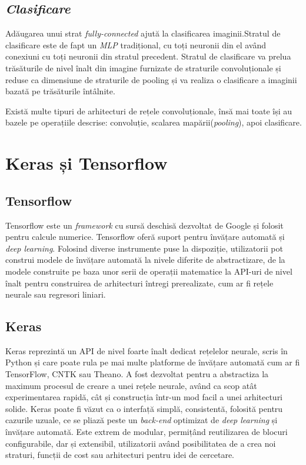 \subsection{\textit{Clasificare}}
 Adăugarea unui strat \textit{fully-connected} ajută la clasificarea imaginii.Stratul de clasificare este de fapt un \textit{MLP} tradițional, cu toți neuronii din el având conexiuni cu toți neuronii din stratul precedent. Stratul de clasificare va prelua trăsăturile de nivel înalt din imagine furnizate de straturile convoluționale și reduse ca dimensiune de straturile de pooling și va realiza o clasificare a imaginii bazată pe trăsăturile întâlnite.

Există multe tipuri de arhitecturi de rețele convoluționale, însă mai toate își au bazele pe operațiile descrise: convoluție, scalarea mapării(\textit{pooling}), apoi clasificare.


\section{Keras și Tensorflow}
\subsection{Tensorflow}
Tensorflow este un \textit{framework} cu sursă deschisă  dezvoltat de Google și folosit pentru calcule numerice. Tensorflow oferă suport pentru învățare automată și \textit{deep learning}. Folosind diverse instrumente puse la dispoziție, utilizatorii pot construi modele de învățare automată la nivele diferite de abstractizare, de la modele construite pe baza unor serii de operații matematice la API-uri de nivel înalt pentru construirea de arhitecturi întregi prerealizate, cum ar fi rețele neurale sau regresori liniari.

\subsection{Keras}
Keras reprezintă un API de nivel foarte înalt dedicat rețelelor neurale, scris în Python și care poate rula pe mai multe platforme de învățare automată cum ar fi TensorFlow, CNTK sau Theano. A fost dezvoltat pentru a abstractiza la maximum procesul de creare a unei rețele neurale, având ca scop atât experimentarea rapidă, cât și construcția într-un mod facil a unei arhitecturi solide. Keras poate fi văzut ca o interfață simplă, consistentă, folosită pentru cazurile uzuale, ce se pliază peste un \textit{back-end} optimizat de \textit{deep learning} și învățare automată. Este extrem de modular, permițând reutilizarea de blocuri configurabile, dar și extensibil, utilizatorii având posibilitatea de a crea noi straturi, funcții de cost sau arhitecturi pentru idei de cercetare. 

